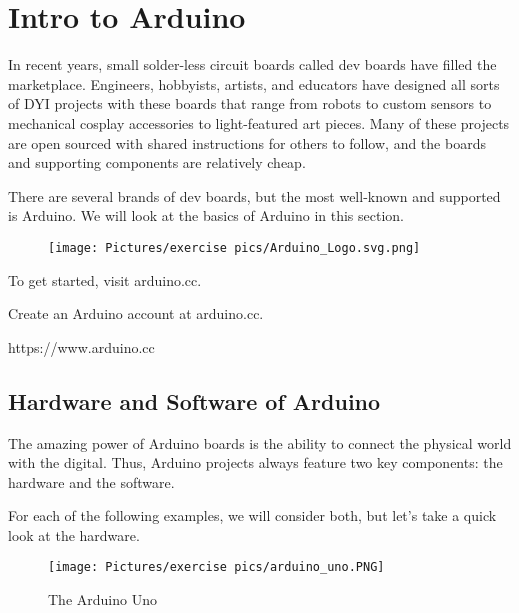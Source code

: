 
\section{Intro to Arduino}

In recent years, small solder-less circuit boards called dev boards have filled the marketplace. Engineers, hobbyists, artists, and educators have designed all sorts of DYI projects with these boards that range from robots to custom sensors to mechanical cosplay accessories to light-featured art pieces. Many of these projects are open sourced with shared instructions for others to follow, and the boards and supporting components are relatively cheap.

\noindent There are several brands of dev boards, but the most well-known and supported is Arduino. We will look at the basics of Arduino in this section.

\begin{figure}[h]
    \centering
    \texttt{[image: Pictures/exercise pics/Arduino\_Logo.svg.png]}
    \label{fig:arduinologo}
\end{figure}

\noindent To get started, visit arduino.cc.

\begin{exercise}
Create an Arduino account at arduino.cc.
\end{exercise}
\footnotesize{https://www.arduino.cc}

\subsection{Hardware and Software of Arduino}

The amazing power of Arduino boards is the ability to connect the physical world with the digital. Thus, Arduino projects always feature two key components: the hardware and the software.

\noindent For each of the following examples, we will consider both, but let's take a quick look at the hardware.

\begin{figure}[h]
    \centering
    \texttt{[image: Pictures/exercise pics/arduino\_uno.PNG]}
    \caption{The Arduino Uno}
    \label{fig:arduinouno}
\end{figure}

